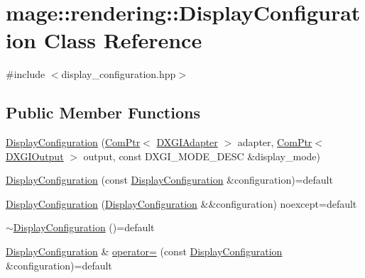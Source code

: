 \hypertarget{classmage_1_1rendering_1_1_display_configuration}{}\section{mage\+:\+:rendering\+:\+:Display\+Configuration Class Reference}
\label{classmage_1_1rendering_1_1_display_configuration}


{\ttfamily \#include $<$display\+\_\+configuration.\+hpp$>$}

\subsection*{Public Member Functions}
\begin{DoxyCompactItemize}
\item 
\hyperlink{classmage_1_1rendering_1_1_display_configuration_ac0ee7768a59ee6a257405faaa942580b}{Display\+Configuration} (\hyperlink{namespacemage_ae74f374780900893caa5555d1031fd79}{Com\+Ptr}$<$ \hyperlink{namespacemage_1_1rendering_ad55e028ebd705b547eeb972ad8d03b6a}{D\+X\+G\+I\+Adapter} $>$ adapter, \hyperlink{namespacemage_ae74f374780900893caa5555d1031fd79}{Com\+Ptr}$<$ \hyperlink{namespacemage_1_1rendering_aaf22d3893277a4bd8497f6ea69b01532}{D\+X\+G\+I\+Output} $>$ output, const D\+X\+G\+I\+\_\+\+M\+O\+D\+E\+\_\+\+D\+E\+SC \&display\+\_\+mode)
\item 
\hyperlink{classmage_1_1rendering_1_1_display_configuration_a96a9331786912fce65dbeca8e3516231}{Display\+Configuration} (const \hyperlink{classmage_1_1rendering_1_1_display_configuration}{Display\+Configuration} \&configuration)=default
\item 
\hyperlink{classmage_1_1rendering_1_1_display_configuration_a9c691b88024f24fa778db90c9f1b9416}{Display\+Configuration} (\hyperlink{classmage_1_1rendering_1_1_display_configuration}{Display\+Configuration} \&\&configuration) noexcept=default
\item 
\hyperlink{classmage_1_1rendering_1_1_display_configuration_a93745480bb92a1e81e4476a897eaab6b}{$\sim$\+Display\+Configuration} ()=default
\item 
\hyperlink{classmage_1_1rendering_1_1_display_configuration}{Display\+Configuration} \& \hyperlink{classmage_1_1rendering_1_1_display_configuration_a847151bc6a61f320811e915119f38f9f}{operator=} (const \hyperlink{classmage_1_1rendering_1_1_display_configuration}{Display\+Configuration} \&configuration)=default
\item 

\end{DoxyCompactItemize}
